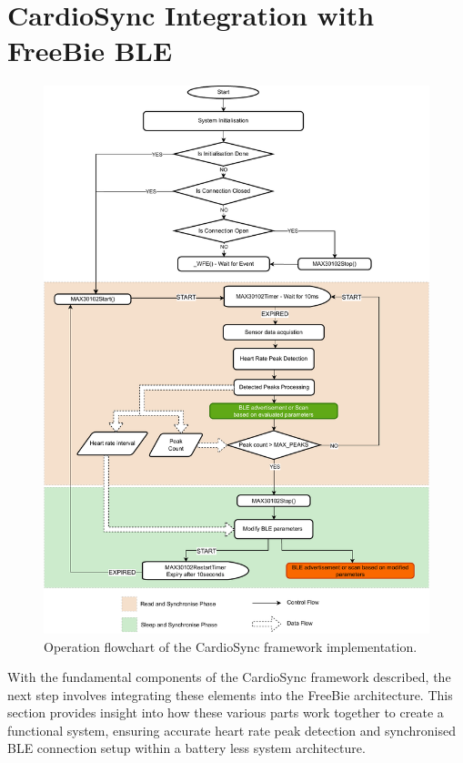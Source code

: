 \section{CardioSync Integration with FreeBie BLE}
\begin{figure}[t]
    \centering
    \includegraphics[width=\linewidth]{chapters/Implementation/Flowchart_CardioSync.pdf}
    \caption{Operation flowchart of the CardioSync framework implementation.}
    \label{fig:flowchart}
\end{figure}


With the fundamental components of the CardioSync framework described, the next step involves integrating these elements into the FreeBie architecture. This section provides insight into how these various parts work together to create a functional system, ensuring accurate heart rate peak detection and synchronised BLE connection setup within a battery less system architecture.
\vspace{1\baselineskip}


